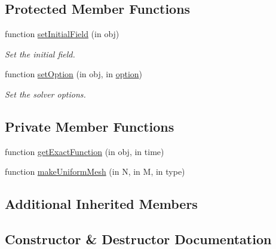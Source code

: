 \subsection*{Protected Member Functions}
\begin{DoxyCompactItemize}
\item 
function \hyperlink{class_friction_parabolic_bowl2d_aa21ebc8fd24d1a20024aac57a4a88914}{set\+Initial\+Field} (in obj)
\begin{DoxyCompactList}\small\item\em Set the initial field. \end{DoxyCompactList}\item 
function \hyperlink{class_friction_parabolic_bowl2d_a6b5d34ec180b589d9f8153583de6caa7}{set\+Option} (in obj, in \hyperlink{class_ndg_phys_af91f4c54b93504e76b38a5693774dff1}{option})
\begin{DoxyCompactList}\small\item\em Set the solver options. \end{DoxyCompactList}\end{DoxyCompactItemize}
\subsection*{Private Member Functions}
\begin{DoxyCompactItemize}
\item 
function \hyperlink{class_friction_parabolic_bowl2d_ad670f5f909a872daf99e3d5743d6bcb6}{get\+Exact\+Function} (in obj, in time)
\item 
function \hyperlink{class_friction_parabolic_bowl2d_ad944010e55218f5252aeddf1a7926f8b}{make\+Uniform\+Mesh} (in N, in M, in type)
\end{DoxyCompactItemize}
\subsection*{Additional Inherited Members}


\subsection{Constructor \& Destructor Documentation}
\mbox{\label{class_friction_parabolic_bowl2d_a1db2f220c5b9d2c6ea85625c1797d15b}} 
